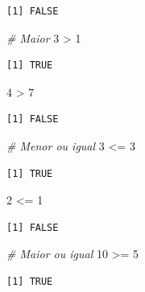 \documentclass[
  brazilian,
]{book}
\newenvironment{Shaded}{\begin{snugshade}}{\end{snugshade}}
\newcommand{\CommentTok}[1]{\textcolor[rgb]{0.56,0.35,0.01}{\textit{#1}}}
\newcommand{\DecValTok}[1]{\textcolor[rgb]{0.00,0.00,0.81}{#1}}
\newcommand{\SpecialCharTok}[1]{\textcolor[rgb]{0.00,0.00,0.00}{#1}}
\begin{document}
\begin{verbatim}
[1] FALSE
\end{verbatim}

\begin{Shaded}
\begin{Highlighting}[]
\CommentTok{\# Maior}
\DecValTok{3} \SpecialCharTok{\textgreater{}} \DecValTok{1}
\end{Highlighting}
\end{Shaded}

\begin{verbatim}
[1] TRUE
\end{verbatim}

\begin{Shaded}
\begin{Highlighting}[]
\DecValTok{4} \SpecialCharTok{\textgreater{}} \DecValTok{7}
\end{Highlighting}
\end{Shaded}

\begin{verbatim}
[1] FALSE
\end{verbatim}

\begin{Shaded}
\begin{Highlighting}[]
\CommentTok{\# Menor ou igual}
\DecValTok{3} \SpecialCharTok{\textless{}=} \DecValTok{3}
\end{Highlighting}
\end{Shaded}

\begin{verbatim}
[1] TRUE
\end{verbatim}

\begin{Shaded}
\begin{Highlighting}[]
\DecValTok{2} \SpecialCharTok{\textless{}=} \DecValTok{1}
\end{Highlighting}
\end{Shaded}

\begin{verbatim}
[1] FALSE
\end{verbatim}

\begin{Shaded}
\begin{Highlighting}[]
\CommentTok{\# Maior ou igual}
\DecValTok{10} \SpecialCharTok{\textgreater{}=} \DecValTok{5}
\end{Highlighting}
\end{Shaded}

\begin{verbatim}
[1] TRUE
\end{verbatim}
\end{document}
